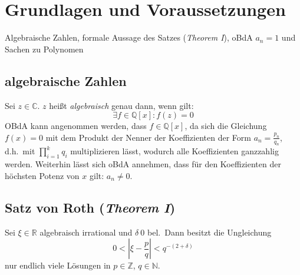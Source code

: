 \documentclass[11pt]{article}
\begin{document}
    \section{Grundlagen und Voraussetzungen}
    \label{sec:basics}
        Algebraische Zahlen, formale Aussage des Satzes (\emph{Theorem I}), oBdA $a_n = 1$ und Sachen zu Polynomen
        
        \subsection{algebraische Zahlen}
        \label{subsec:algebraic-numbers}
            \textrm{Sei $z \in \mathbb{C}$. $z$ heißt \emph{algebraisch} genau dann, wenn gilt:}
            \begin{equation}
                \exists f \in \mathbb{Q}[x] : f(z) = 0 \label{eq:def-algebraic}
            \end{equation}
            \textrm{OBdA kann angenommen werden, dass $f \in \mathbb{Q}[x]$, da sich die Gleichung $f(x) = 0$ mit dem
            Produkt der Nenner der Koeffizienten der Form $a_n = \frac{p_n}{q_n}$, d.h.\ mit $\prod_{i=1}^k q_i$
            multiplizieren lässt, wodurch alle Koeffizienten ganzzahlig werden.
            \newline
            Weiterhin lässt sich oBdA annehmen, dass für den Koeffizienten der höchsten Potenz von $x$ gilt: $a_n \neq 0$.}
        
        \subsection{Satz von Roth (\emph{Theorem I})}
        \label{subsec:th1}
            Sei $\xi \in \mathbb{R}$ algebraisch irrational und $\delta \> 0$ bel.\ Dann besitzt die Ungleichung
            \begin{equation}
                0 < | \xi - \frac{p}{q} | < q^{-(2+\delta)} \label{eq:svr}
            \end{equation}
            \textrm{nur endlich viele Lösungen in $p \in \mathbb{Z}$, $q \in \mathbb{N}$.}
        
\end{document}
